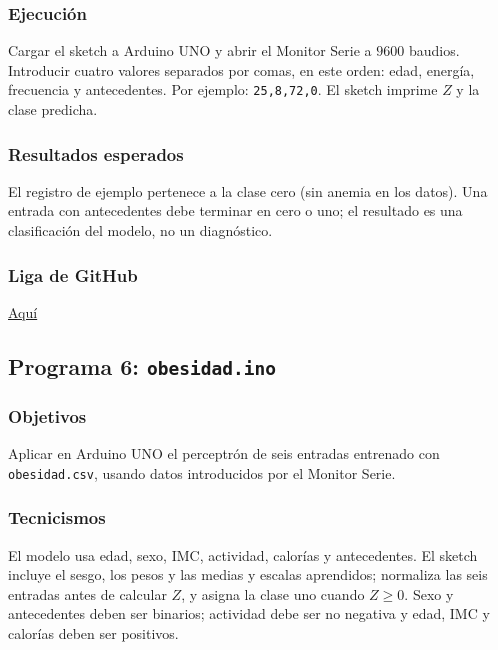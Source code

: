 \documentclass{article}[12pt,a4paper]
\begin{document}
\inputminted{cpp}{../clase011/anemia.ino}

\subsubsection{Ejecución}

Cargar el sketch a Arduino UNO y abrir el Monitor Serie a \(9600\) baudios.
Introducir cuatro valores separados por comas, en este orden: edad, energía,
frecuencia y antecedentes. Por ejemplo: \texttt{25,8,72,0}. El sketch imprime
\(Z\) y la clase predicha.

\subsubsection{Resultados esperados}

El registro de ejemplo pertenece a la clase cero (sin anemia en los datos). Una
entrada con antecedentes debe terminar en cero o uno; el resultado es una
clasificación del modelo, no un diagnóstico.

\subsubsection{Liga de \textbf{GitHub}}

\href{https://github.com/MarcosHCK/master-programming/tree/master/clase011}{Aquí \faGithubSquare}

\subsection{Programa 6: \texttt{obesidad.ino}}

\subsubsection{Objetivos}

Aplicar en Arduino UNO el perceptrón de seis entradas entrenado con
\texttt{obesidad.csv}, usando datos introducidos por el Monitor Serie.

\subsubsection{Tecnicismos}

El modelo usa edad, sexo, IMC, actividad, calorías y antecedentes. El sketch
incluye el sesgo, los pesos y las medias y escalas aprendidos; normaliza las seis
entradas antes de calcular \(Z\), y asigna la clase uno cuando \(Z\geq0\). Sexo
y antecedentes deben ser binarios; actividad debe ser no negativa y edad, IMC y
calorías deben ser positivos.
\end{document}
